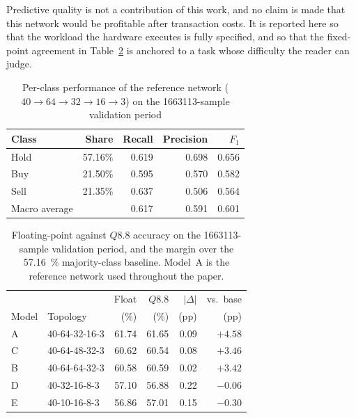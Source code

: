\documentclass[final,5p,times,twocolumn]{elsarticle}
\begin{document}
Predictive quality is not a contribution of this work, and no claim is made that
this network would be profitable after transaction costs. It is reported here so
that the workload the hardware executes is fully specified, and so that the
fixed-point agreement in Table~\ref{tab:model_performance} is anchored to a task
whose difficulty the reader can judge.

\begin{table}[htbp]
\centering
\caption{Per-class performance of the reference network
($40\!\rightarrow\!64\!\rightarrow\!32\!\rightarrow\!16\!\rightarrow\!3$) on the
\num{1663113}-sample validation period}
\label{tab:per_class}
\small
\begin{tabular}{@{}lrrrr@{}}
\toprule
Class & Share & Recall & Precision & $F_1$ \\
\midrule
Hold & 57.16\% & 0.619 & 0.698 & 0.656 \\
Buy  & 21.50\% & 0.595 & 0.570 & 0.582 \\
Sell & 21.35\% & 0.637 & 0.506 & 0.564 \\
\midrule
Macro average & \ & 0.617 & 0.591 & 0.601 \\
\bottomrule
\end{tabular}
\end{table}

\begin{table}[htbp]
\centering
\caption{Floating-point against $Q8.8$ accuracy on the
\num{1663113}-sample validation period, and the margin over the
\SI{57.16}{\percent} majority-class baseline. Model~A is the reference network
used throughout the paper.}
\label{tab:model_performance}
\small
\begin{tabular}{@{}llrrrr@{}}
\toprule
 & & Float & $Q8.8$ & $|\Delta|$ & vs.\ base \\
Model & Topology & (\%) & (\%) & (pp) & (pp) \\
\midrule
A & 40-64-32-16-3    & 61.74 & 61.65 & 0.09 & $+4.58$ \\
C & 40-64-48-32-3    & 60.62 & 60.54 & 0.08 & $+3.46$ \\
B & 40-64-64-32-3    & 60.58 & 60.59 & 0.02 & $+3.42$ \\
D & 40-32-16-8-3     & 57.10 & 56.88 & 0.22 & $-0.06$ \\
E & 40-10-16-8-3     & 56.86 & 57.01 & 0.15 & $-0.30$ \\
\bottomrule
\end{tabular}
\end{table}
\end{document}
